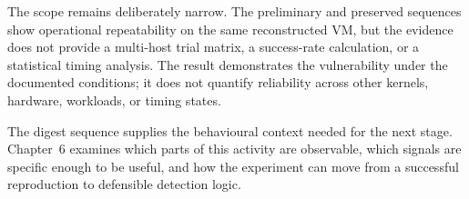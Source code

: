 The scope remains deliberately narrow. The preliminary and preserved sequences
show operational repeatability on the same reconstructed VM, but the evidence
does not provide a multi-host trial matrix, a success-rate calculation, or a
statistical timing analysis. The result demonstrates the vulnerability under
the documented conditions; it does not quantify reliability across other
kernels, hardware, workloads, or timing states.

The digest sequence supplies the behavioural context needed for the next stage.
Chapter~6 examines which parts of this activity are observable, which signals
are specific enough to be useful, and how the experiment can move from a
successful reproduction to defensible detection logic.